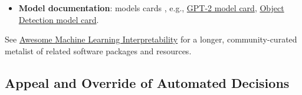 \documentclass[information,article,submit,moreauthors,pdftex]{definitions/mdpi}
\begin{document}
\begin{itemize}[leftmargin=*,labelsep=5.8mm]
\item \textbf{Model documentation}: models cards \cite{model_cards}, e.g.,  \href{https://github.com/openai/gpt-2/blob/master/model_card.md}{GPT-2 model card}, \href{https://modelcards.withgoogle.com/object-detection}{Object Detection model card}. 

\end{itemize}

\noindent See \href{https://github.com/jphall663/awesome-machine-learning-interpretability}{Awesome Machine Learning Interpretability} for a longer, community-curated metalist of related software packages and resources. 

\subsection{Appeal and Override of Automated Decisions}
\end{document}

